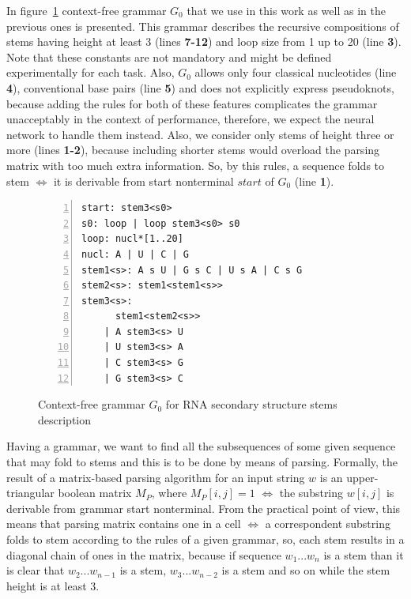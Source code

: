 In figure~\ref{gram} context-free grammar $G_0$ that we use in this work as well as in the previous ones is presented. This grammar describes the recursive compositions of stems having height at least 3 (lines \textbf{7-12}) and loop size from 1 up to 20 (line \textbf{3}). Note that these constants are not mandatory and might be defined experimentally for each task. Also, $G_0$ allows only four classical nucleotides (line \textbf{4}), conventional base pairs (line \textbf{5}) and does not explicitly express pseudoknots, because adding the rules for both of these features complicates the grammar unacceptably in the context of performance, therefore, we expect the neural network to handle them instead. Also, we consider only stems of height three or more (lines \textbf{1-2}), because including shorter stems would overload the parsing matrix with too much extra information. So, by this rules, a sequence folds to stem $\iff$ it is derivable from start nonterminal $start$ of $G_0$ (line \textbf{1}).

\begin{figure}[ht]
\begin{Verbatim}[numbers=left,xleftmargin=5mm]
start: stem3<s0>
s0: loop | loop stem3<s0> s0
loop: nucl*[1..20]
nucl: A | U | C | G
stem1<s>: A s U | G s C | U s A | C s G
stem2<s>: stem1<stem1<s>>
stem3<s>: 
      stem1<stem2<s>>
    | A stem3<s> U
    | U stem3<s> A
    | C stem3<s> G
    | G stem3<s> C
\end{Verbatim}
\caption{Context-free grammar $G_0$ for RNA secondary structure stems description}
\label{gram}
\end{figure}

Having a grammar, we want to find all the subsequences of some given sequence that may fold to stems and this is to be done by means of parsing. Formally, the result of a matrix-based parsing algorithm for an input string $w$ is an upper-triangular boolean matrix $M_P$, where $M_P [i,j] = 1$ $\iff$ the substring $w[i,j]$ is derivable from grammar start nonterminal. From the practical point of view, this means that parsing matrix contains one in a cell $\iff$ a correspondent substring folds to stem according to the rules of a given grammar, so, each stem results in a diagonal chain of ones in the matrix, because if sequence $w_1...w_n$ is a stem than it is clear that $w_2...w_{n - 1}$ is a stem, $w_3...w_{n - 2}$ is a stem and so on while the stem height is at least 3.

